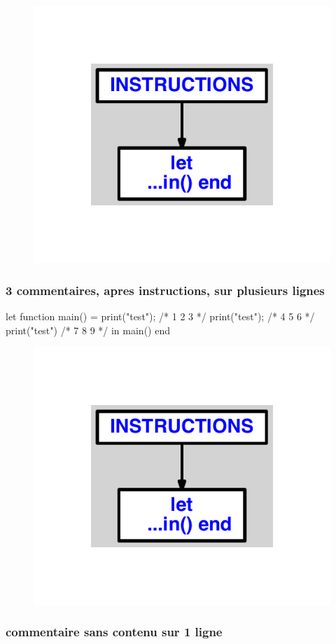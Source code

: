 \documentclass{article}
\begin{document}
\begin{figure}[H]\centering\includegraphics[max width=\textwidth]{ast/ast_160.pdf}\end{figure}\subsubsection{3 commentaires, apres instructions, sur plusieurs lignes}
\begin{verbatimtab}
let
	function main() =
		print("test");
		/*
		1
		2
		3
		*/
		print("test");
		/*
		4
		5
		6
		*/
		print("test")
		/*
		7
		8
		9
		*/
in main() end
\end{verbatimtab}
\begin{figure}[H]\centering\includegraphics[max width=\textwidth]{ast/ast_161.pdf}\end{figure}\subsubsection{commentaire sans contenu sur 1 ligne}
\end{document}
